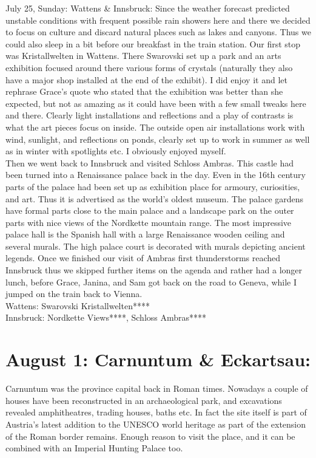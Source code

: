 {July 25, Sunday: Wattens \& Innsbruck:
Since the weather forecast predicted unstable conditions with frequent possible rain showers here and there we decided to focus on culture and discard natural places such as lakes and canyons. Thus we could also sleep in a bit before our breakfast in the train station. Our first stop was Kristallwelten in Wattens. There Swarovski set up a park and an arts exhibition focused around there various forms of crystals (naturally they also have a major shop installed at the end of the exhibit). I did enjoy it and let rephrase Grace's quote who stated that the exhibition was better than she expected, but not as amazing as it could have been with a few small tweaks here and there. Clearly light installations and reflections and a play of contrasts is what the art pieces focus on inside. The outside open air installations work with wind, sunlight, and reflections on ponds, clearly set up to work in summer as well as in winter with spotlights etc. I obviously enjoyed myself.\\
Then we went back to Innsbruck and visited Schloss Ambras. This castle had been turned into a Renaissance palace back in the day. Even in the 16th century parts of the palace had been set up as exhibition place for armoury, curiosities, and art. Thus it is advertised as the world's oldest museum. The palace gardens have formal parts close to the main palace and a landscape park on the outer parts with nice views of the Nordkette mountain range. The most impressive palace hall is the Spanish hall with a large Renaissance wooden ceiling and several murals. The high palace court is decorated with murals depicting ancient legends. Once we finished our visit of Ambras first thunderstorms reached Innsbruck thus we skipped further items on the agenda and rather had a longer lunch, before Grace, Janina, and Sam got back on the road to Geneva, while I jumped on the train back to Vienna.\\

Wattens: Swarovski Kristallwelten****\\
Innsbruck: Nordkette Views****, Schloss Ambras****

\section{August 1: Carnuntum \& Eckartsau:}
\label{2021CarnuntumEckartsau}

Carnuntum was the province capital back in Roman times. Nowadays a couple of houses have been reconstructed in an archaeological park, and excavations revealed amphitheatres, trading houses, baths etc. In fact the site itself is part of Austria's latest addition to the UNESCO world heritage as part of the extension of the Roman border remains. Enough reason to visit the place, and it can be combined with an Imperial Hunting Palace too.\\

}
